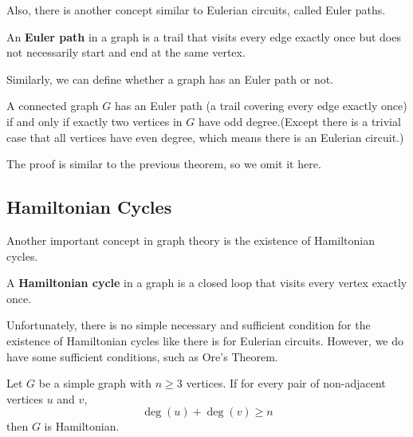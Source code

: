 \documentclass[oneside]{book}
\begin{document}
Also, there is another concept similar to Eulerian circuits, called Euler paths.

\begin{definition}
An \textbf{Euler path} in a graph is a trail that visits every edge exactly once but does not necessarily start and end at the same vertex.
\end{definition}

Similarly, we can define whether a graph has an Euler path or not.

\begin{theorem}
A connected graph $G$ has an Euler path (a trail covering every edge exactly once) if and only if exactly two vertices in $G$ have odd degree.(Except there is a trivial case that all vertices have even degree, which means there is an Eulerian circuit.)
\end{theorem}

The proof is similar to the previous theorem, so we omit it here.

\subsection{Hamiltonian Cycles}

Another important concept in graph theory is the existence of Hamiltonian cycles.

\begin{definition}
A \textbf{Hamiltonian cycle} in a graph is a closed loop that visits every vertex exactly once.
\end{definition}

Unfortunately, there is no simple necessary and sufficient condition for the existence of Hamiltonian cycles like there is for Eulerian circuits. However, we do have some sufficient conditions, such as Ore's Theorem.

\begin{theorem}
Let $G$ be a simple graph with $n \ge 3$ vertices. If for every pair of non-adjacent vertices $u$ and $v$,
\[ \deg(u) + \deg(v) \ge n \]
then $G$ is Hamiltonian.
\end{theorem}
\end{document}

